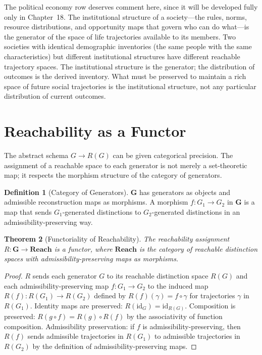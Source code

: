 \documentclass[12pt, oneside]{book}
\theoremstyle{flyxion}
\newtheorem{theorem}{Theorem}[chapter]
\theoremstyle{definition}
\newtheorem{definition}[theorem]{Definition}
\begin{document}
The political economy row deserves comment here, since
it will be developed fully only in Chapter~18. The
institutional structure of a society---the rules, norms,
resource distributions, and opportunity maps that govern
who can do what---is the generator of the space of life
trajectories available to its members. Two societies with
identical demographic inventories (the same people with
the same characteristics) but different institutional
structures have different reachable trajectory spaces.
The institutional structure is the generator; the
distribution of outcomes is the derived inventory. What
must be preserved to maintain a rich space of future
social trajectories is the institutional structure, not
any particular distribution of current outcomes.

\section{Reachability as a Functor}

The abstract schema $G \to R(G)$ can be given categorical
precision. The assignment of a reachable space to each
generator is not merely a set-theoretic map; it respects
the morphism structure of the category of generators.

\begin{definition}[Category of Generators]
$\mathbf{G}$ has generators as objects and admissible
reconstruction maps as morphisms. A morphism
$f : G_1 \to G_2$ in $\mathbf{G}$ is a map that sends
$G_1$-generated distinctions to $G_2$-generated
distinctions in an admissibility-preserving way.
\end{definition}

\begin{theorem}[Functoriality of Reachability]
\label{thm:R_functor}
The reachability assignment $R : \mathbf{G} \to
\mathbf{Reach}$ is a functor, where $\mathbf{Reach}$
is the category of reachable distinction spaces with
admissibility-preserving maps as morphisms.
\end{theorem}

\begin{proof}
$R$ sends each generator $G$ to its reachable distinction
space $R(G)$ and each admissibility-preserving map
$f : G_1 \to G_2$ to the induced map
$R(f) : R(G_1) \to R(G_2)$ defined by
$R(f)(\gamma) = f \circ \gamma$ for trajectories
$\gamma$ in $R(G_1)$. Identity maps are preserved:
$R(\mathrm{id}_G) = \mathrm{id}_{R(G)}$. Composition
is preserved: $R(g \circ f) = R(g) \circ R(f)$ by the
associativity of function composition. Admissibility
preservation: if $f$ is admissibility-preserving, then
$R(f)$ sends admissible trajectories in $R(G_1)$ to
admissible trajectories in $R(G_2)$ by the definition
of admissibility-preserving maps.
\end{proof}
\end{document}
